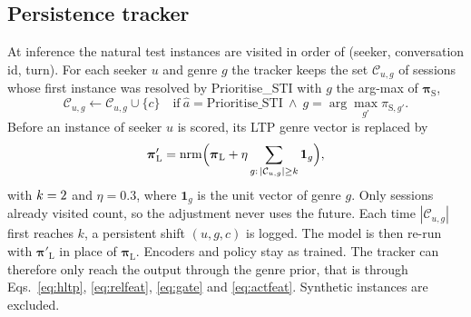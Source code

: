 \subsection{Persistence tracker}
\label{sec:persist}
At inference the natural test instances are visited in order of (seeker, conversation id, turn). For each seeker $u$ and genre $g$ the tracker keeps the set $\mathcal{C}_{u,g}$ of sessions whose first instance was resolved by Prioritise\_STI with $g$ the arg-max of $\boldsymbol{\pi}_{\mathrm{S}}$,
\begin{equation}
  \label{eq:persist-count}
  \mathcal{C}_{u,g}\leftarrow\mathcal{C}_{u,g}\cup\{c\}\quad\text{if}\ \hat{a}=\text{Prioritise\_STI}\ \wedge\ g=\arg\max_{g'}\pi_{\mathrm{S},g'} .
\end{equation}
Before an instance of seeker $u$ is scored, its LTP genre vector is replaced by
\begin{equation}
  \label{eq:persist-adjust}
  \boldsymbol{\pi}'_{\mathrm{L}}=\operatorname{nrm}\!\Big(\boldsymbol{\pi}_{\mathrm{L}}+\eta\sum_{g:\,|\mathcal{C}_{u,g}|\ge k}\mathbf{1}_{g}\Big),
\end{equation}
with $k=2$ and $\eta=0.3$, where $\mathbf{1}_g$ is the unit vector of genre $g$. Only sessions already visited count, so the adjustment never uses the future. Each time $|\mathcal{C}_{u,g}|$ first reaches $k$, a persistent shift $(u,g,c)$ is logged. The model is then re-run with $\boldsymbol{\pi}'_{\mathrm{L}}$ in place of $\boldsymbol{\pi}_{\mathrm{L}}$. Encoders and policy stay as trained. The tracker can therefore only reach the output through the genre prior, that is through Eqs.~\eqref{eq:hltp}, \eqref{eq:relfeat}, \eqref{eq:gate} and \eqref{eq:actfeat}. Synthetic instances are excluded.

